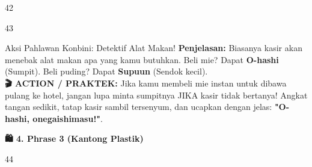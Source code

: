 \begin{convobox}{42}
    \noindent
      

    \vspace{1.5em}
\end{convobox}

\begin{convobox}{43}
    \noindent
     

    \vspace{1.5em}
\end{convobox}

\begin{lessonbox}{Aksi Pahlawan Konbini: Detektif Alat Makan!}
    \textbf{Penjelasan:} Biasanya kasir akan menebak alat makan apa yang kamu butuhkan. Beli mie? Dapat \textbf{O-hashi} (Sumpit). Beli puding? Dapat \textbf{Supuun} (Sendok kecil).
    \\
    \textbf{🎬 ACTION / PRAKTEK:}
    Jika kamu membeli mie instan untuk dibawa pulang ke hotel, jangan lupa minta sumpitnya JIKA kasir tidak bertanya! 
    Angkat tangan sedikit, tatap kasir sambil tersenyum, dan ucapkan dengan jelas: \textbf{"O-hashi, onegaishimasu!"}.
\end{lessonbox}

\vspace{2em}
\begin{tcolorbox}[colback=boxframe, colframe=boxframe, rounded corners, boxrule=0pt, arc=3mm, left=2mm, top=2mm, bottom=2mm]
    \Large \bfseries \color{white} 🛍️ 4. Phrase 3 (Kantong Plastik)
\end{tcolorbox}
\vspace{1em}

\begin{convobox}{44}
    \noindent
       
     

    \vspace{1.5em}
\end{convobox}

